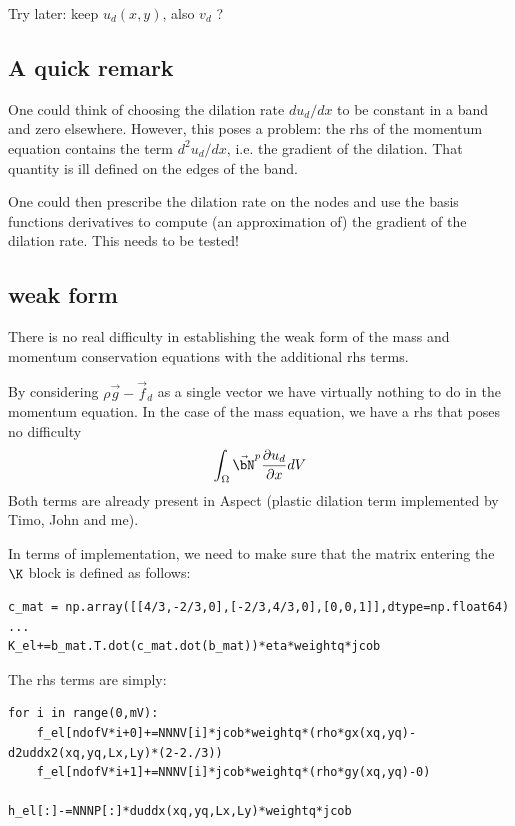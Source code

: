 {\color{red} Try later: keep $u_d(x,y)$, also $v_d$ ? }

\subsection*{A quick remark}

One could think of choosing the dilation rate $du_d/dx$ to be constant in a band and 
zero elsewhere. However, this poses a problem: the rhs of the momentum equation 
contains the term $d^2u_d/dx$, i.e. the gradient of the dilation. That quantity is ill 
defined on the edges of the band. 

One could then prescribe the dilation rate on the nodes and use the basis functions derivatives
to compute (an approximation of) the gradient of the dilation rate. This needs to be tested!

\subsection*{weak form}

There is no real difficulty in establishing the weak form 
of the mass and momentum conservation equations with the additional rhs terms. 

By considering $\rho\vec{g}-\vec{f}_d$ as a single vector we have virtually nothing to do 
in the momentum equation. 
In the case of the mass equation, we have a rhs that poses no difficulty 
\[
\int_\Omega \vec{\bN}^p \frac{\partial u_d}{\partial x}  dV
\]
Both terms are already present in Aspect (plastic dilation term implemented by Timo, John and me).

In terms of implementation, we need to make sure that the matrix entering the $\K$ block is defined as 
follows:
\begin{lstlisting}
c_mat = np.array([[4/3,-2/3,0],[-2/3,4/3,0],[0,0,1]],dtype=np.float64) 
...
K_el+=b_mat.T.dot(c_mat.dot(b_mat))*eta*weightq*jcob
\end{lstlisting}
The rhs terms are simply:
\begin{lstlisting}
for i in range(0,mV):
    f_el[ndofV*i+0]+=NNNV[i]*jcob*weightq*(rho*gx(xq,yq)-d2uddx2(xq,yq,Lx,Ly)*(2-2./3))
    f_el[ndofV*i+1]+=NNNV[i]*jcob*weightq*(rho*gy(xq,yq)-0)

h_el[:]-=NNNP[:]*duddx(xq,yq,Lx,Ly)*weightq*jcob
\end{lstlisting}


